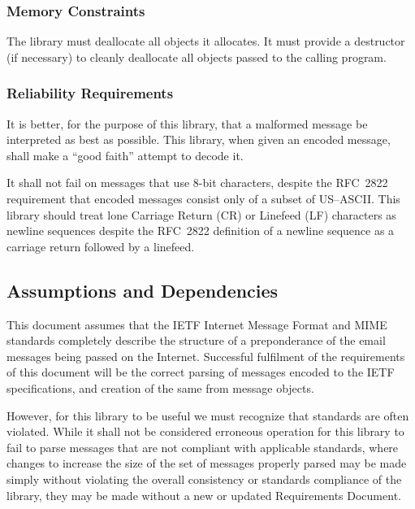 \documentclass[11pt]{article}
\begin{document}
\subsubsection{Memory Constraints}

The library must deallocate all objects it allocates. It must provide
a destructor (if necessary) to cleanly deallocate all objects passed to
the calling program.

\subsubsection{Reliability Requirements}
\label{reliability}

It is better, for the purpose of this library, that a malformed
message be interpreted as best as possible. This library, when given
an encoded message, shall make a ``good faith'' attempt to decode
it. 

It shall not fail on messages that use 8-bit characters, despite the
RFC~2822 requirement that encoded messages consist only of a subset of
US--ASCII. This library should treat lone Carriage Return (CR) or
Linefeed (LF) characters as newline sequences despite the RFC~2822
definition of a newline sequence as a carriage return followed by a
linefeed. 


\subsection{Assumptions and Dependencies}
\label{assumptions}

This document assumes that the IETF Internet Message Format and MIME
standards completely describe the structure of a preponderance of the
email messages being passed on the Internet. Successful fulfilment of
the requirements of this document will be the correct parsing of
messages encoded to the IETF specifications, and creation of the same
from message objects.

However, for this library to be useful we must recognize that
standards are often violated. While it shall not be considered
erroneous operation for this library to fail to parse messages that
are not compliant with applicable standards, where changes to increase
the size of the set of messages properly parsed may be made
simply without violating the overall consistency or standards
compliance of the library, they may be made without a new or updated
Requirements Document.
\end{document}
